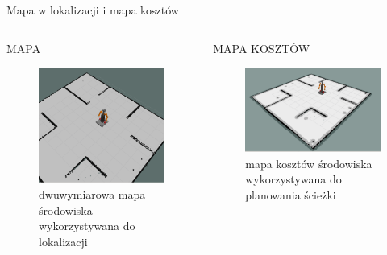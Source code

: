 \begin{frame}{Mapa w lokalizacji i mapa kosztów}
\begin{columns}
		\begin{column}{0.5\textwidth}
			\begin{center}
				MAPA
				\begin{figure}
					\centering
					\includegraphics[height=0.5\textheight]{img/mapa_2d.png}
					\caption{dwuwymiarowa mapa środowiska wykorzystywana do lokalizacji}
				\end{figure}
			\end{center}
		\end{column}
		\begin{column}{0.5\textwidth}  %
			\begin{center}
				MAPA KOSZTÓW
				\begin{figure}
					\centering
					\includegraphics[height=0.5\textheight]{img/costmapa.png}
					\caption{mapa kosztów środowiska wykorzystywana do planowania ścieżki}
				\end{figure}
			\end{center}
		\end{column}
	\end{columns}
\end{frame}

